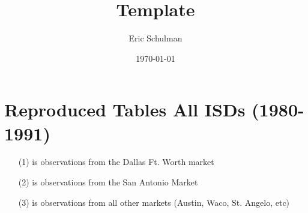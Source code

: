 \documentclass{article}
\title{Template}
\author{Eric Schulman}
\date{\today}
\begin{document}
\section{Reproduced Tables All ISDs (1980-1991)}


\pagebreak


\pagebreak


\pagebreak


\begin{enumerate}
\item[(1)] is observations from the Dallas Ft. Worth market
\item[(2)] is observations from the San Antonio Market
\item[(3)] is observations from all other markets (Austin, Waco, St. Angelo, etc)
\end{enumerate}
\pagebreak
\end{document}
